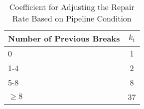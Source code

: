 \begin{table}[H]
	\centering
	\caption{Coefficient for Adjusting the Repair Rate Based on Pipeline Condition}
	\label{table:kt}
	\small
	\begin{tabular}{lc}
		\hline
		Number of Previous Breaks & $k_t$\\ \hline
		0 & 1 \\
		1-4 & 2 \\
		5-8 & 8 \\
		$\geq 8$ & 37 \\
		\hline
	\end{tabular}
\end{table}
